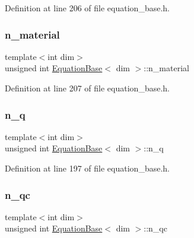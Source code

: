 Definition at line 206 of file equation\+\_\+base.\+h.

\mbox{\label{class_equation_base_a6eba5e7408331bce23945068cba4ed19}} 
\subsubsection{\texorpdfstring{n\+\_\+material}{n\_material}}
{\footnotesize\ttfamily template$<$int dim$>$ \\
unsigned int \hyperlink{class_equation_base}{Equation\+Base}$<$ dim $>$\+::n\+\_\+material\hspace{0.3cm}{\ttfamily [protected]}}



Definition at line 207 of file equation\+\_\+base.\+h.

\mbox{\label{class_equation_base_a8b8a299e37005a06a089ace9f473f94e}} 
\subsubsection{\texorpdfstring{n\+\_\+q}{n\_q}}
{\footnotesize\ttfamily template$<$int dim$>$ \\
unsigned int \hyperlink{class_equation_base}{Equation\+Base}$<$ dim $>$\+::n\+\_\+q\hspace{0.3cm}{\ttfamily [protected]}}



Definition at line 197 of file equation\+\_\+base.\+h.

\mbox{\label{class_equation_base_a001c60e6c8df319b9f267688f84471da}} 
\subsubsection{\texorpdfstring{n\+\_\+qc}{n\_qc}}
{\footnotesize\ttfamily template$<$int dim$>$ \\
unsigned int \hyperlink{class_equation_base}{Equation\+Base}$<$ dim $>$\+::n\+\_\+qc\hspace{0.3cm}{\ttfamily [protected]}}



